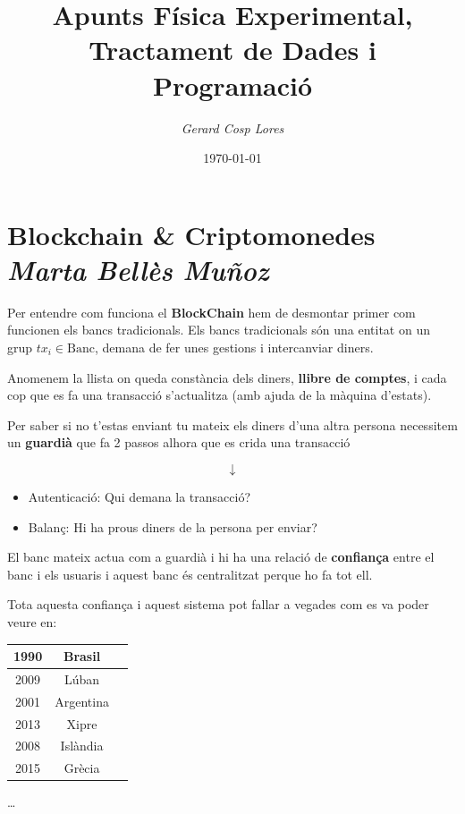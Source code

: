 \documentclass[12pt]{article}
\title{\textbf{Apunts Física Experimental, Tractament de Dades i Programació}}
\author{\textit{Gerard Cosp Lores}}
\date{\today}
\begin{document}
\justifying

\maketitle
\tableofcontents

\newpage

\section[Blockchain \& Criptomonedes]{Blockchain \& Criptomonedes\\[-0.2ex]\textit{Marta Bellès Muñoz}}

Per entendre com funciona el \textbf{BlockChain} hem de desmontar primer com funcionen els bancs tradicionals. Els bancs tradicionals són una entitat on un grup $tx_i \in \text{Banc}$, demana de fer unes gestions i intercanviar diners.

Anomenem la llista on queda constància dels diners, \textbf{llibre de comptes}, i cada cop que es fa una transacció s'actualitza (amb ajuda de la màquina d'estats).

Per saber si no t'estas enviant tu mateix els diners d'una altra persona necessitem un \textbf{guardià} que fa 2 passos alhora que es crida una transacció

\[\downarrow\]

\begin{itemize}
    \item Autenticació: Qui demana la transacció?
    \item Balanç: Hi ha prous diners de la persona per enviar?
\end{itemize}

El banc mateix actua com a guardià i hi ha una relació de \textbf{confiança} entre el banc i els usuaris i aquest banc és centralitzat perque ho fa tot ell.

Tota aquesta confiança i aquest sistema pot fallar a vegades com es va poder veure en:

\begin{table}[h]
\centering
\begin{tabular}{|c|c|c|}
\hline
1990 & Brasil \\ \hline
2009 & Lúban \\ \hline
2001 & Argentina \\ \hline
2013 & Xipre \\ \hline
2008 & Islàndia \\ \hline
2015 & Grècia \\ \hline
\end{tabular}
\end{table}\dots
\end{document}
